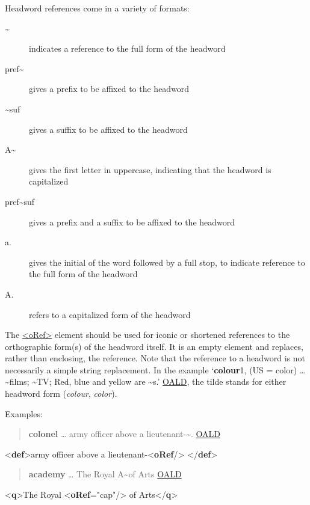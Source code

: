 Headword references come in a variety of formats:\begin{description}

\item[{\textasciitilde  }]indicates a reference to the full form of the headword
\item[{pref\textasciitilde  }]gives a prefix to be affixed to the headword
\item[{\textasciitilde suf }]gives a suffix to be affixed to the headword
\item[{A\textasciitilde  }]gives the first letter in uppercase, indicating that the headword is capitalized
\item[{pref\textasciitilde suf }]gives a prefix and a suffix to be affixed to the headword
\item[{a. }]gives the initial of the word followed by a full stop, to indicate reference to the full form of the headword
\item[{A. }]refers to a capitalized form of the headword 
\end{description} \par
The \hyperref[TEI.oRef]{<oRef>} element should be used for iconic or shortened references to the orthographic form(s) of the headword itself. It is an empty element and replaces, rather than enclosing, the reference. Note that the reference to a headword is not necessarily a simple string replacement. In the example ‘{\bfseries colour}1, (US = color) …\textasciitilde  films; \textasciitilde  TV; Red, blue and yellow are \textasciitilde s.’ \hyperref[DIC-OALD]{OALD}, the tilde stands for either headword form (\textit{colour}, \textit{color}).\par
Examples:
\begin{quote}{\bfseries colonel} … army officer above a lieutenant-\textasciitilde . \hyperref[DIC-OALD]{OALD}\end{quote}
 \par\bgroup{}\exampleFont \begin{shaded}\noindent\mbox{}{<\textbf{def}>}army officer above a lieutenant-{<\textbf{oRef}/>}\mbox{}\newline 
{</\textbf{def}>}\end{shaded}\egroup\par \noindent           
\begin{quote}{\bfseries academy} … The Royal A\textasciitilde  of Arts \hyperref[DIC-OALD]{OALD}\end{quote}
 \par\bgroup{}\exampleFont \begin{shaded}\noindent\mbox{}{<\textbf{q}>}The Royal {<\textbf{oRef}\hspace*{1em}{type}="{cap}"/>} of Arts{</\textbf{q}>}\end{shaded}\egroup\par \noindent                                                       \par
